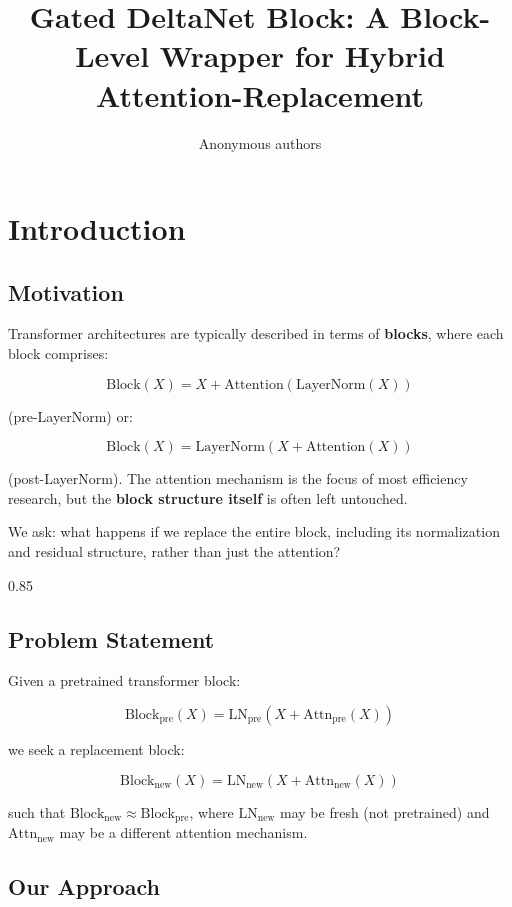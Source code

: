 \title{\textbf{Gated DeltaNet Block: A Block-Level Wrapper for Hybrid Attention-Replacement}}

\author{Anonymous authors}



\section{Introduction}

\subsection{Motivation}

Transformer architectures are typically described in terms of \textbf{blocks}, 
where each block comprises:

\[
\text{Block}(X) = X + \text{Attention}(\text{LayerNorm}(X))
\tag{1.1}
\]

(pre-LayerNorm) or:

\[
\text{Block}(X) = \text{LayerNorm}(X + \text{Attention}(X))
\tag{1.2}
\]

(post-LayerNorm). The attention mechanism is the focus of most efficiency 
research, but the \textbf{block structure itself} is often left untouched.

We ask: what happens if we replace the entire block, including its 
normalization and residual structure, rather than just the attention?

0.85


\subsection{Problem Statement}

Given a pretrained transformer block:

\[
\text{Block}_\text{pre}(X) = \text{LN}_\text{pre}(X + \text{Attn}_\text{pre}(X))
\tag{1.3}
\]

we seek a replacement block:

\[
\text{Block}_\text{new}(X) = \text{LN}_\text{new}(X + \text{Attn}_\text{new}(X))
\tag{1.4}
\]

such that $\text{Block}_\text{new} \approx \text{Block}_\text{pre}$, where 
$\text{LN}_\text{new}$ may be fresh (not pretrained) and $\text{Attn}_\text{new}$ 
may be a different attention mechanism.

\subsection{Our Approach}

